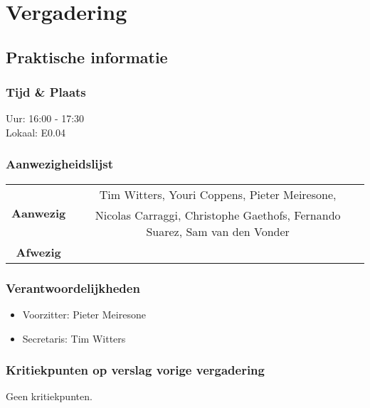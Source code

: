 \section{Vergadering \MeetingDate}
\subsection{Praktische informatie}
\subsubsection{Tijd \& Plaats}
Uur: 16:00 - 17:30
\\
Lokaal: E0.04
\subsubsection{Aanwezigheidslijst}
\begin{table}[htbp]
	\centering
	\begin{tabular}{c|c}
		\multirow{2}{*}{\textbf{Aanwezig}} & Tim Witters, Youri Coppens, Pieter Meiresone, \\
		& Nicolas Carraggi,  Christophe Gaethofs, Fernando Suarez, Sam van den Vonder \\
		\hline
		\textbf{Afwezig} & \\
	\end{tabular}
\end{table}

\subsubsection{Verantwoordelijkheden}
\begin{itemize}
	\item Voorzitter: Pieter Meiresone
	\item Secretaris: Tim Witters
\end{itemize}

\subsubsection{Kritiekpunten op verslag vorige vergadering}
Geen kritiekpunten.

